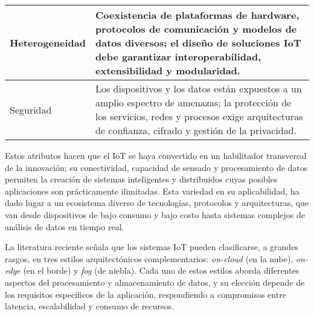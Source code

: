\begin{longtable}{l|p{10cm}}
    Heterogeneidad & Coexistencia de plataformas de hardware, protocolos de comunicación y modelos de datos diversos; el diseño de soluciones IoT debe garantizar interoperabilidad, extensibilidad y modularidad.\\
    \hline

    Seguridad & Los dispositivos y los datos están expuestos a un amplio espectro de amenazas; la protección de los servicios, redes y procesos exige arquitecturas de confianza, cifrado y gestión de la privacidad.\\
    \hline


\end{longtable}

Estos atributos hacen que el IoT se haya convertido en un habilitador transversal de la innovación; su conectividad, capacidad de sensado y procesamiento de datos permiten la creación de sistemas inteligentes y distribuidos cuyas posibles aplicaciones son prácticamente ilimitadas. Esta variedad en su aplicabilidad, ha dado lugar a un ecosistema diverso de tecnologías, protocolos y arquitecturas, que van desde dispositivos de bajo consumo y bajo costo hasta sistemas complejos de análisis de datos en tiempo real.

La literatura reciente señala que los sistemas IoT pueden clasificarse, a grandes rasgos, en tres estilos arquitectónicos complementarios: \textit{on-cloud} (en la nube), \textit{on-edge} (en el borde) y \textit{fog} (de niebla). Cada uno de estos estilos aborda diferentes aspectos del procesamiento y almacenamiento de datos, y su elección depende de los requisitos específicos de la aplicación, respondiendo a compromisos entre latencia, escalabilidad y consumo de recursos.

